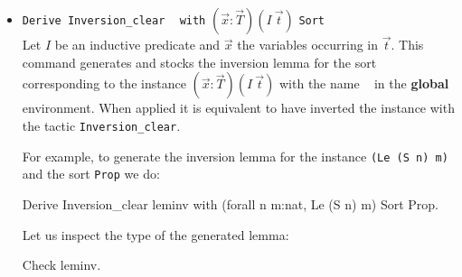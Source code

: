 \begin{itemize}

\item \texttt{Derive Inversion\_clear} \ident~ \texttt{with}
  $(\vec{x}:\vec{T})(I~\vec{t})$ \texttt{Sort} \sort~ \\ 
  Let $I$ be an inductive predicate and $\vec{x}$ the variables
  occurring in $\vec{t}$. This command generates and stocks
  the inversion lemma for the sort  \sort~  corresponding to the instance
  $(\vec{x}:\vec{T})(I~\vec{t})$ with the name \ident~ in the {\bf
    global} environment. When applied it is equivalent to have
  inverted the instance with the tactic {\tt Inversion\_clear}.


  For example, to generate the inversion lemma for the instance
 \texttt{(Le (S n) m)} and the sort \texttt{Prop} we do:
\begin{coq_example}
Derive Inversion_clear leminv with (forall n m:nat, Le (S n) m) Sort
 Prop.
\end{coq_example}

Let us  inspect the type of the generated lemma:
\begin{coq_example}
Check leminv.
\end{coq_example}



\end{itemize}

%



